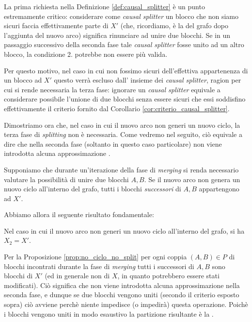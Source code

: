 La prima richiesta nella Definizione \ref{def:causal_splitter} è un punto estremamente critico: considerare come \emph{causal splitter} un blocco che non siamo sicuri faccia effettivamente parte di $X'$ (che, ricordiamo, è la \rscp del grafo dopo l'aggiunta del nuovo arco) significa rinunciare ad unire due blocchi. Se in un passaggio successivo della seconda fase tale \emph{causal splitter} fosse unito ad un altro blocco, la condizione 2. potrebbe non essere più valida.

Per questo motivo, nel caso in cui non fossimo sicuri dell'effettiva appartenenza di un blocco ad $X'$ questo verrà escluso dall' insieme dei \emph{causal splitter}, ragion per cui si rende necessaria la terza fase: ignorare un \emph{causal splitter} equivale a considerare possibile l'unione di due blocchi senza essere sicuri che essi soddisfino effettivamente il criterio fornito dal Corollario \ref{cor:criterio_causal_splitter}.

Dimostriamo ora che, nel caso in cui il nuovo arco non generi un nuovo ciclo, la terza fase di \emph{splitting} non è necessaria. Come vedremo nel seguito, ciò equivale a dire che nella seconda fase (soltanto in questo caso particolare) non viene introdotta alcuna approssimazione \cite{saha}.

\begin{proposition}
    \label{prop:no_ciclo_no_split}
    Supponiamo che durante un'iterazione della fase di \emph{merging} si renda necessario valutare la possibilità di unire due blocchi $A,B$. Se il nuovo arco non genera un nuovo ciclo all'interno del grafo, tutti i blocchi \emph{successori} di $A,B$ appartengono ad $X'$.
\end{proposition}

Abbiamo allora il seguente risultato fondamentale:

\begin{proposition}
    Nel caso in cui il nuovo arco non generi un nuovo ciclo all'interno del grafo, si ha $X_2 = X'$.
\end{proposition}
\begin{proof2}
    Per la Proposizione \ref{prop:no_ciclo_no_split} per ogni coppia $(A,B) \in P$ di blocchi incontrati durante la fase di \emph{merging} tutti i successori di $A,B$ sono blocchi di $X'$ (ed in generale non di $X$, in quanto potrebbero essere stati modificati). Ciò significa che non viene introdotta alcuna approssimazione nella seconda fase, e dunque se due blocchi vengono uniti (secondo il criterio esposto sopra) ciò avviene perchè niente impedisce (o impedirà) questa operazione. Poichè i blocchi vengono uniti in modo esaustivo la partizione risultante è la \rscp.
\end{proof2}

